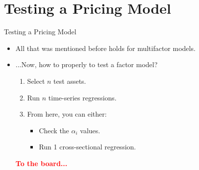 \documentclass{beamer}
\newcommand{\highlightred}[1]{\textcolor{red}{\textbf{#1}}}
\begin{document}
\section{Testing a Pricing Model}
\begin{frame}{Testing a Pricing Model}
    \begin{itemize}
        \item All that was mentioned before holds for multifactor models.
        \item ...Now, how to properly to test a factor model?
        \begin{enumerate}
            \item Select $n$ test assets.
            \item Run $n$ time-series regressions.
            \item From here, you can either:
            \begin{itemize}
                \item Check the $\alpha_i$ values.
                \item Run 1 cross-sectional regression.
            \end{itemize}
        \end{enumerate}
        \highlightred{To the board...}
    \end{itemize}
\end{frame}
\end{document}
